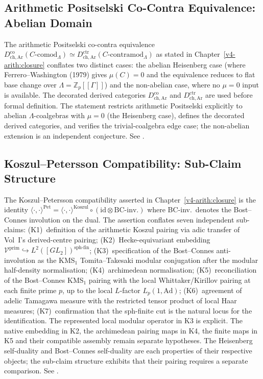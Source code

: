 \subsection{Arithmetic Positselski Co-Contra Equivalence: Abelian Domain}

The arithmetic Positselski co-contra equivalence
\(D^{\mathrm{co}}_{\mathrm{ch,Ar}}(C\text{-comod}_\Lambda)\simeq
D^{\mathrm{ctr}}_{\mathrm{ch,Ar}}(C\text{-contramod}_\Lambda)\)
as stated in Chapter~\ref{v4-arith:closure} conflates two distinct
cases: the abelian Heisenberg case (where Ferrero--Washington (1979)
gives \(\mu(C)=0\) and the equivalence reduces to flat base change over
\(\Lambda=\mathbb{Z}_p[[\Gamma]]\)) and the non-abelian case, where
no \(\mu=0\) input is available. The decorated derived categories
\(D^{\mathrm{co}}_{\mathrm{ch,Ar}}\) and
\(D^{\mathrm{ctr}}_{\mathrm{ch,Ar}}\) are used before formal definition.
The statement restricts arithmetic Positselski explicitly to abelian
\(\Lambda\)-coalgebras with \(\mu=0\) (the Heisenberg case), defines
the decorated derived categories, and verifies the trivial-coalgebra
edge case; the non-abelian extension is an independent conjecture.
See .

\subsection{Koszul--Petersson Compatibility: Sub-Claim Structure}

The Koszul--Petersson compatibility asserted in Chapter~\ref{v4-arith:closure}
is the identity
\(\langle\cdot,\cdot\rangle^{\mathrm{Pet}}=\langle\cdot,\cdot\rangle^{\mathrm{Koszul}}\circ(\mathrm{id}\otimes\text{BC-inv.})\)
where BC-inv.\ denotes the Bost--Connes involution on the dual.
The assertion conflates seven independent sub-claims:
(K1)~definition of the arithmetic Koszul pairing via adic transfer of
Vol~I's derived-centre pairing;
(K2)~Hecke-equivariant embedding
\(\mathcal{V}^{\mathrm{prim}}\hookrightarrow L^{2}([GL_{2}])^{\mathrm{sph\text{-}fin}}\);
(K3)~specification of the Bost--Connes anti-involution as the
KMS\({}_{1}\) Tomita--Takesaki modular conjugation after the modular
half-density normalisation;
(K4)~archimedean normalisation;
(K5)~reconciliation of the Bost--Connes KMS\({}_{1}\) pairing with
the local Whittaker/Kirillov pairing at each finite prime \(p\), up
to the local \(L\)-factor \(L_{p}(1,\mathrm{Ad})\);
(K6)~agreement of adelic Tamagawa measure with the restricted tensor
product of local Haar measures;
(K7)~confirmation that the sph-finite cut is the natural locus for
the identification.
The represented local modular operator in K3 is explicit. The native
embedding in K2, the archimedean pairing maps in K4, the finite maps
in K5 and their compatible assembly remain separate hypotheses.
The Heisenberg self-duality and Bost--Connes self-duality are each
properties of their respective objects; the sub-claim structure
exhibits that their pairing requires a separate comparison.
See .


